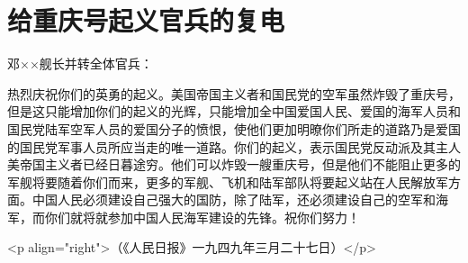 \section[给重庆号起义官兵的复电（一九四九年三月二十四日）]{给重庆号起义官兵的复电}


邓××舰长并转全体官兵：

热烈庆祝你们的英勇的起义。美国帝国主义者和国民党的空军虽然炸毁了重庆号，但是这只能增加你们的起义的光辉，只能增加全中国爱国人民、爱国的海军人员和国民党陆军空军人员的爱国分子的愤恨，使他们更加明暸你们所走的道路乃是爱国的国民党军事人员所应当走的唯一道路。你们的起义，表示国民党反动派及其主人美帝国主义者已经日暮途穷。他们可以炸毁一艘重庆号，但是他们不能阻止更多的军舰将要随着你们而来，更多的军舰、飞机和陆军部队将要起义站在人民解放军方面。中国人民必须建设自己强大的国防，除了陆军，还必须建设自己的空军和海军，而你们就将就参加中国人民海军建设的先锋。祝你们努力！

<p align="right">（《人民日报》一九四九年三月二十七日）</p>

